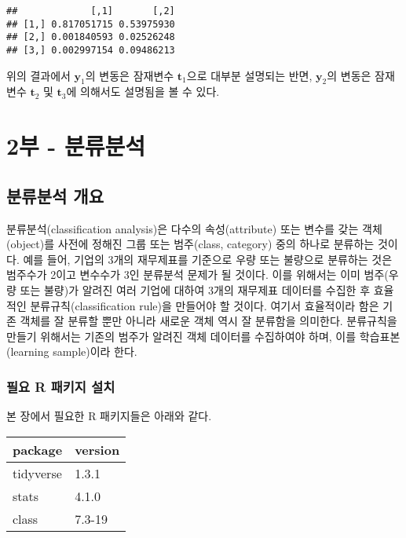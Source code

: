 \documentclass[
]{book}
\begin{document}
\begin{verbatim}
##             [,1]       [,2]
## [1,] 0.817051715 0.53975930
## [2,] 0.001840593 0.02526248
## [3,] 0.002997154 0.09486213
\end{verbatim}

위의 결과에서 \(\mathbf{y}_1\)의 변동은 잠재변수 \(\mathbf{t}_1\)으로 대부분 설명되는 반면, \(\mathbf{y}_2\)의 변동은 잠재변수 \(\mathbf{t}_2\) 및 \(\mathbf{t}_3\)에 의해서도 설명됨을 볼 수 있다.

\hypertarget{part-2uxbd80---uxbd84uxb958uxbd84uxc11d}{%
\part{2부 - 분류분석}\label{part-2uxbd80---uxbd84uxb958uxbd84uxc11d}}

\hypertarget{classification-analysis}{%
\chapter{분류분석 개요}\label{classification-analysis}}

분류분석(classification analysis)은 다수의 속성(attribute) 또는 변수를 갖는 객체(object)를 사전에 정해진 그룹 또는 범주(class, category) 중의 하나로 분류하는 것이다. 예를 들어, 기업의 3개의 재무제표를 기준으로 우량 또는 불량으로 분류하는 것은 범주수가 2이고 변수수가 3인 분류분석 문제가 될 것이다. 이를 위해서는 이미 범주(우량 또는 불량)가 알려진 여러 기업에 대하여 3개의 재무제표 데이터를 수집한 후 효율적인 분류규칙(classification rule)을 만들어야 할 것이다. 여기서 효율적이라 함은 기존 객체를 잘 분류할 뿐만 아니라 새로운 객체 역시 잘 분류함을 의미한다. 분류규칙을 만들기 위해서는 기존의 범주가 알려진 객체 데이터를 수집하여야 하며, 이를 학습표본(learning sample)이라 한다.

\hypertarget{classification-packages-install}{%
\section{필요 R 패키지 설치}\label{classification-packages-install}}

본 장에서 필요한 R 패키지들은 아래와 같다.

\begin{tabular}{l|l}
\hline
package & version\\
\hline
tidyverse & 1.3.1\\
\hline
stats & 4.1.0\\
\hline
class & 7.3-19\\
\hline
\end{tabular}
\end{document}
